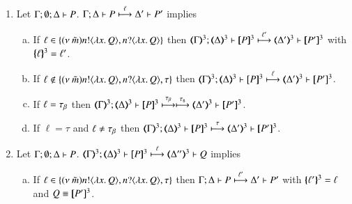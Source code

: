 \begin{proposition}\rm
	\label{prop:op_corr_HOpp_to_HOp}
	\begin{enumerate}
		\item	Let $\Gamma; \emptyset; \Delta \vdash P$.
			$\Gamma; \Delta \vdash P \stackrel{\ell}{\longmapsto} \Delta' \vdash P'$ implies
%
			\begin{enumerate}[a)]
				\item	If $\ell \in \{(\nu\ \tilde{m}) n ! \langle \lambda x.\,Q \rangle, n ? \langle \lambda x.\,Q \rangle\}$ then
					$\horel{\tmap{\Gamma}{3}}{\tmap{\Delta}{3}}{\pmap{P}{3}}{\hby{\ell'}}
					{\tmap{\Delta'}{3}}{\pmap{P'}{3}}$ with $\{\!\!\{\ell\}\!\!\}^{3} = \ell'$.

%
%

				\item	If $\ell \notin \{(\nu\ \tilde{m}) n ! \langle \lambda x.\,Q \rangle, n ? \langle \lambda x.\,Q \rangle, \tau\}$ then
					$\horel{\tmap{\Gamma}{3}}{\tmap{\Delta}{3}}{\pmap{P}{3}}{\hby{\ell}}
					{\tmap{\Delta'}{3}}{\pmap{P'}{3}}$.

				\item	If $\ell = \tau_{\beta}$ then
					$\horel{\tmap{\Gamma}{3}}{\tmap{\Delta}{3}}{\pmap{P}{3}}{\hby{\btau} \hby{\stau}}
					{\tmap{\Delta'}{3}}{\pmap{P'}{3}}$.

				\item	If $\ell = \tau$ and $\ell \not= \tau_{\beta}$ then %
					$\horel{\tmap{\Gamma}{3}}{\tmap{\Delta}{3}}{\pmap{P}{3}}{\hby{\tau}}
					{\tmap{\Delta'}{3}}{\pmap{P'}{3}}$.
			\end{enumerate}

		\item	Let $\Gamma; \emptyset; \Delta \vdash P$.
			$\horel{\tmap{\Gamma}{3}}{\tmap{\Delta}{3}}{\pmap{P}{3}}{\hby{\ell}}
			{\tmap{\Delta''}{3}}{Q}$ implies
%
			\begin{enumerate}[a)]
				\item	If $\ell \in \{(\nu\ \tilde{m}) n ! \langle \lambda x.\,Q \rangle, n ? \langle \lambda x.\,Q \rangle, \tau\}$
					then
					$\Gamma; \Delta \vdash P \stackrel{\ell'}{\longmapsto} \Delta' \vdash P'$
					with $\{\!\!\{\ell'\}\!\!\}^{3} = \ell$ and $Q \equiv [\!\![P']\!\!]^{3}$.


\end{enumerate}
\end{enumerate}
\end{proposition}
